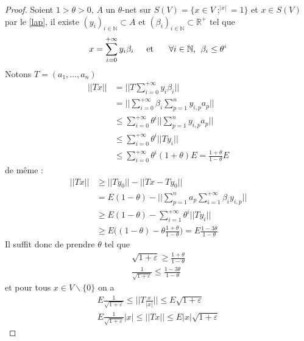 \documentclass[12pt]{article}
\begin{document}
\begin{proof} 
	Soient $1>\theta>0$, $A$ un $\theta$-net sur $S(V)=\big\{x\in V \; ;^|x|=1\big\}$ et $x\in S(V)$ par le \ref{lap},  il existe $(y_i)_{i\in\mathbb{N}}\subset A$ et $(\beta_i)_{i\in\mathbb{N}}\subset \mathbb{R}^{+}$ tel que 
	\begin{equation*}
	x = \sum_{i=0}^{+\infty}y_i \beta_i \text{\hspace{4mm} et \hspace{4mm} $\forall i\in \mathbb{N}$, }\; \beta_i\leq \theta^i
	\end{equation*}
	Notons $T=(a_1,...,a_n)$
	\begin{align*}
	||Tx|| &= \big|\big| T\sum_{i=0}^{+\infty}y_i \beta_i\big|\big|\\
	&=  \big|\big| \sum_{i=0}^{+\infty}\beta_i \sum_{p=1}^{n}y_{i,p}a_p \big|\big|\\
	&\leq \sum_{i=0}^{+\infty}\theta^i ||\sum_{p=1}^{n}y_{i,p}a_p||\\
	&\leq \sum_{i=0}^{+\infty}\theta^i ||Ty_i||\\
	& \leq  \sum_{i=0}^{+\infty}\theta^i (1+\theta)E=\frac{1+\theta}{1-\theta}E
	\end{align*}
	de même :
	\begin{align*}
	||Tx|| &\geq||Ty_0||- ||Tx-Ty_0||\\
	&= E(1-\theta) - ||\sum_{p=1}^{n}a_p\sum_{i=1}^{+\infty}\beta_i y_{i,p}||\\
	&\geq E(1-\theta)- \sum_{i=1}^{+\infty}\theta^i ||Ty_i||\\
	&\geq E\big((1-\theta)- \theta\frac{1+\theta}{1-\theta}\big)= E \frac{1-3\theta}{1-\theta}
	\end{align*}
	Il suffit donc de prendre $\theta$ tel que
	\begin{equation*}
	\begin{array}{cc}
	\sqrt{1+\varepsilon}\geq \frac{1+\theta}{1-\theta}\\
	\frac{1}{\sqrt{1+\varepsilon}}\leq \frac{1-3\theta}{1-\theta}
	\end{array}
	\end{equation*}
	et pour tous $x\in V \backslash\{0\}$ on a 
	\begin{equation*}
	\begin{array}{cc}
	E\frac{1}{\sqrt{1+\varepsilon}}\leq\big|\big|T\frac{x}{|x|}\big|\big|\leq E \sqrt{1+\varepsilon}\\
	E\frac{1}{\sqrt{1+\varepsilon}}|x|\leq||Tx||\leq E|x|\sqrt{1+\varepsilon}
	\end{array}

\end{equation*}
\end{proof}
\end{document}
